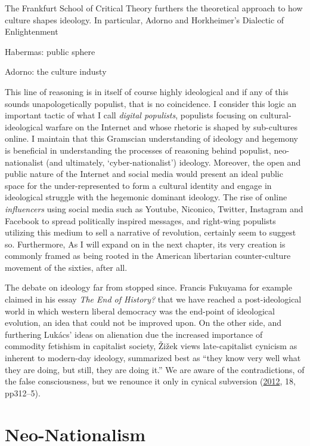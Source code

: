 \documentclass[10pt,british,A4paper,,openany]{memoir}
\begin{document}
The Frankfurt School of Critical Theory furthers the theoretical
approach to how culture shapes ideology. In particular, Adorno and
Horkheimer's Dialectic of Enlightenment

Habermas: public sphere

Adorno: the culture industy

This line of reasoning is in itself of course highly ideological and if
any of this sounds unapologetically populist, that is no coincidence. I
consider this logic an important tactic of what I call \emph{digital
populists}, populists focusing on cultural-ideological warfare on the
Internet and whose rhetoric is shaped by sub-cultures online. I maintain
that this Gramscian understanding of ideology and hegemony is beneficial
in understanding the processes of reasoning behind populist,
neo-nationalist (and ultimately, `cyber-nationalist') ideology.
Moreover, the open and public nature of the Internet and social media
would present an ideal public space for the under-represented to form a
cultural identity and engage in ideological struggle with the hegemonic
dominant ideology. The rise of online \emph{influencers} using social
media such as Youtube, Niconico, Twitter, Instagram and Facebook to
spread politically inspired messages, and right-wing populists utilizing
this medium to sell a narrative of revolution, certainly seem to suggest
so. Furthermore, As I will expand on in the next chapter, its very
creation is commonly framed as being rooted in the American libertarian
counter-culture movement of the sixties, after all.

The debate on ideology far from stopped since. Francis Fukuyama for
example claimed in his essay \emph{The End of History?} that we have
reached a post-ideological world in which western liberal democracy was
the end-point of ideological evolution, an idea that could not be
improved upon. On the other side, and furthering Lukács' ideas on
alienation due the increased importance of commodity fetishism in
capitalist society, Žižek views late-capitalist cynicism as inherent to
modern-day ideology, summarized best as ``they know very well what they
are doing, but still, they are doing it.'' We are aware of the
contradictions, of the false consciousness, but we renounce it only in
cynical subversion (\protect\hyperlink{ref-zizek_mapping_2012}{2012},
18, pp312--5).

\section{Neo-Nationalism}\label{neo-nationalism}
\end{document}
